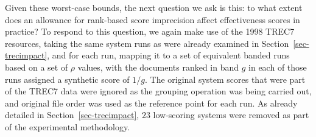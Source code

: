 \documentclass[runningheads,a4paper]{llncs}
\begin{document}
Given these worst-case bounds, the next question we ask is this: to
what extent does an allowance for rank-based score imprecision affect
effectiveness scores in practice?
To respond to this question, we again make use of the 1998 TREC7
resources, taking the same system runs as were already examined in
Section~\ref{sec-trecimpact}, and for each run, mapping it to a set
of equivalent banded runs based on a set of $\rho$ values, with the
documents ranked in band $g$ in each of those runs assigned a
synthetic score of $1/g$.
The original system scores that were part of the TREC7 data were
ignored as the grouping operation was being carried out, and original
file order was used as the reference point for each run.
As already detailed in Section~\ref{sec-trecimpact}, $23$ low-scoring
systems were removed as part of the experimental methodology.
\end{document}
